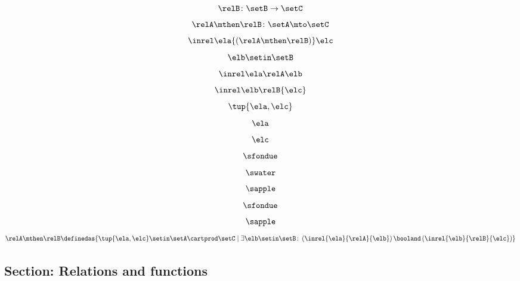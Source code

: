 \begin{forslides}
\begin{equation}\label{slides_session2_84}
\relB \colon \setB \to \setC
\end{equation}
 \begin{equation}\label{slides_session2_85}
\relA \mthen \relB \colon \setA \mto \setC
\end{equation}
\begin{equation}\label{slides_session2_86}
\inrel \ela {(\relA \mthen \relB)} \elc
\end{equation}
 \begin{equation}\label{slides_session2_87}
\elb \setin \setB
\end{equation}
\begin{equation}\label{slides_session2_88}
\inrel \ela \relA \elb 
\end{equation}
 \begin{equation}\label{slides_session2_89}
\inrel \elb \relB{\elc}
\end{equation}
\begin{equation}\label{slides_session2_90}
\tup{\ela,\elc}
\end{equation}
 \begin{equation}\label{slides_session2_91}
\ela
\end{equation}
\begin{equation}\label{slides_session2_92}
\elc
\end{equation}
 \begin{equation}\label{slides_session2_93}
\sfondue
\end{equation}
\begin{equation}\label{slides_session2_94}
\swater
\end{equation}
 \begin{equation}\label{slides_session2_95}
\sapple
\end{equation}
\begin{equation}\label{slides_session2_96}
\sfondue
\end{equation}
 \begin{equation}\label{slides_session2_97}
\sapple
\end{equation}
\begin{equation}\label{slides_session2_98}
 \relA \mthen \relB \definedas \{\tup{\ela,\elc} \setin \setA \cartprod \setC \mid  \exists \elb \setin \setB \colon \left(\inrel{\ela}{\relA}{\elb} \right) \booland \left(\inrel{\elb}{\relB}{\elc}\right)\}
\end{equation}

\subsection{Section: Relations and functions}  


\end{forslides}
